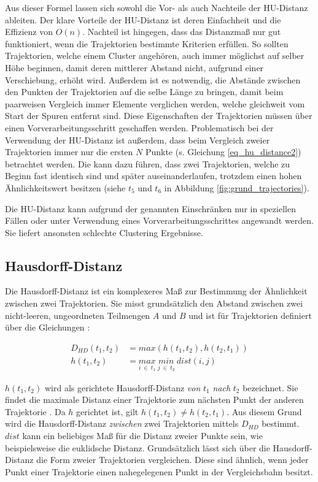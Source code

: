 Aus dieser Formel lassen sich sowohl die Vor- als auch Nachteile der HU-Distanz ableiten. Der klare Vorteile der
HU-Distanz ist deren Einfachheit und die Effizienz von $O(n)$.
Nachteil ist hingegen, dass das Distanzmaß nur gut funktioniert, wenn die Trajektorien bestimmte
Kriterien erfüllen. So sollten Trajektorien, welche einem Cluster angehören, auch immer möglichst auf selber Höhe beginnen,
damit deren mittlerer Abstand nicht, aufgrund einer Verschiebung, erhöht wird.
Außerdem ist es notwendig, die Abstände zwischen den Punkten der Trajektorien auf die selbe Länge zu bringen,
damit beim paarweisen Vergleich immer Elemente verglichen werden, welche gleichweit vom Start der Spuren entfernt sind.
Diese Eigenschaften der Trajektorien müssen über einen Vorverarbeitungsschritt geschaffen werden.
Problematisch bei der Verwendung der HU-Distanz ist außerdem, dass beim Vergleich zweier Trajektorien immer nur
die ersten $N$ Punkte (s. Gleichung \ref{eq_hu_distance2}) betrachtet werden. Die kann dazu führen, dass zwei
Trajektorien, welche zu Beginn fast identisch sind und später auseinanderlaufen, trotzdem einen hohen Ähnlichkeitswert besitzen
(siehe $t_5$ und $t_6$ in Abbildung \ref{fig:grund_trajectories}).

Die HU-Distanz kann aufgrund der genannten Einschränken nur in speziellen Fällen oder unter Verwendung eines
Vorverarbeitungsschrittes angewandt werden. Sie liefert ansonsten schlechte Clustering Ergebnisse.

\subsection{Hausdorff-Distanz}
\label{sec:hausdorff_distance}

Die Hausdorff-Distanz ist ein komplexeres Maß zur Bestimmung der Ähnlichkeit zwischen zwei Trajektorien.
Sie misst grundsätzlich den Abstand zwischen zwei nicht-leeren, ungeordneten Teilmengen $A$ und $B$ und ist für
Trajektorien definiert über die Gleichungen \cite[]{Atev2010}:

\begin{ceqn}
\begin{align}
\label{eq_hausdorff1}
    D_{HD}(t_1, t_2) &= max(h(t_1, t_2), h(t_2, t_1)) \\
\label{eq_hausdorff2}
    h(t_1, t_2) &= \underset{i\ \in\ t_1}{max}\ \underset{j\ \in\ t_2}{min}\ dist(i, j)
\end{align}
\end{ceqn}

$h(t_1, t_2)$ wird als gerichtete Hausdorff-Distanz \textit{von} $t_1$ \textit{nach} $t_2$ bezeichnet.
Sie findet die maximale Distanz einer Trajektorie zum nächsten Punkt der anderen Trajektorie \cite[]{Huttenlocher}.
Da $h$ gerichtet ist, gilt $h(t_1, t_2) \neq h(t_2, t_1)$. Aus diesem Grund wird die Hausdorff-Distanz
\textit{zwischen} zwei Trajektorien mittels $D_{HD}$ bestimmt. $dist$ kann ein beliebiges Maß für die Distanz zweier
Punkte sein, wie beispielsweise die euklidsche Distanz.
Grundsätzlich lässt sich über die Hausdorff-Distanz die Form zweier Trajektorien vergleichen. Diese sind ähnlich,
wenn jeder Punkt einer Trajektorie einen nahegelegenen Punkt in der Vergleichsbahn besitzt.

